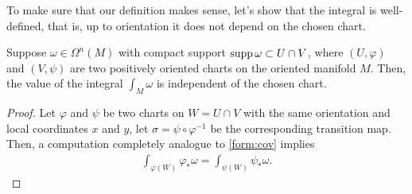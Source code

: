To make sure that our definition makes sense, let's show that the integral is well-defined, that is, up to orientation it does not depend on the chosen chart.

\begin{lemma}\label{lemma:intindep:chart}
	Suppose $\omega\in\Omega^n(M)$ with compact support $\operatorname{supp} \omega \subset U\cap V$, where $(U, \varphi)$ and $(V, \psi)$ are two positively oriented charts on the oriented manifold $M$.
	Then, the value of the integral $\int_M\omega$ is independent of the chosen chart.
\end{lemma}
\begin{proof}
	Let $\varphi$ and $\psi$ be two charts on $W = U\cap V$ with the same orientation and local coordinates $x$ and $y$, let $\sigma = \psi\circ\varphi^{-1}$ be the corresponding transition map.
	Then, a computation completely analogue to \eqref{form:cov} implies
	\begin{align}
		\int_{\varphi(W)} \varphi_*\omega = \int_{\psi(W)} \psi_*\omega.
	\end{align}
\end{proof}

